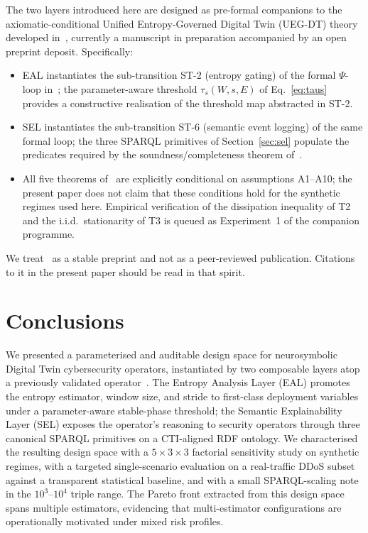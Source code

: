 \documentclass[runningheads]{llncs}
\newcommand{\psiop}{\ensuremath{\Psi}}
\newcommand{\taus}{\ensuremath{\tau_{s}}}
\begin{document}
The two layers introduced here are designed as pre-formal companions to
the axiomatic-conditional Unified Entropy-Governed Digital Twin
(UEG-DT) theory developed in~\cite{paper5}, currently a manuscript in
preparation accompanied by an open preprint deposit. Specifically:

\begin{itemize}[leftmargin=*]
  \item EAL instantiates the sub-transition ST-2 (entropy gating) of
        the formal $\psiop$-loop in~\cite{paper5}; the parameter-aware
        threshold $\taus(W, s, E)$ of Eq.~\eqref{eq:taus} provides a
        constructive realisation of the threshold map abstracted in
        ST-2.
  \item SEL instantiates the sub-transition ST-6 (semantic event
        logging) of the same formal loop; the three SPARQL primitives
        of Section~\ref{sec:sel} populate the predicates required by
        the soundness/completeness theorem of~\cite{paper5}.
  \item All five theorems of~\cite{paper5} are explicitly conditional
        on assumptions A1--A10; the present paper does not claim that
        these conditions hold for the synthetic regimes used here.
        Empirical verification of the dissipation inequality of T2 and
        the i.i.d.\ stationarity of T3 is queued as Experiment~1 of the
        companion programme.
\end{itemize}

\noindent We treat~\cite{paper5} as a stable preprint and not as a
peer-reviewed publication. Citations to it in the present paper should
be read in that spirit.

\section{Conclusions}
\label{sec:conclusion}

We presented a parameterised and auditable design space for
neurosymbolic Digital Twin cybersecurity operators, instantiated by two
composable layers atop a previously validated operator~\cite{paper3}.
The Entropy Analysis Layer (EAL) promotes the entropy estimator, window
size, and stride to first-class deployment variables under a
parameter-aware stable-phase threshold; the Semantic Explainability
Layer (SEL) exposes the operator's reasoning to security operators
through three canonical SPARQL primitives on a CTI-aligned RDF
ontology. We characterised the resulting design space with a
$5\times 3\times 3$ factorial sensitivity study on synthetic regimes,
with a targeted single-scenario evaluation on a real-traffic DDoS
subset against a transparent statistical baseline, and with a small
SPARQL-scaling note in the $10^{3}$--$10^{4}$ triple range. The Pareto
front extracted from this design space spans multiple estimators,
evidencing that multi-estimator configurations are operationally
motivated under mixed risk profiles.
\end{document}
